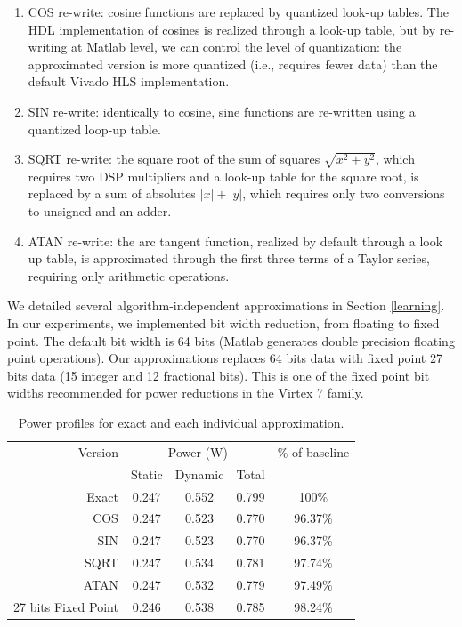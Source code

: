 \begin{enumerate}
\item COS re-write: cosine functions are replaced by quantized look-up tables. The HDL implementation of cosines is realized through a look-up table, but by re-writing at Matlab level, we can control the level of quantization: the approximated version is more quantized (i.e., requires fewer data) than the default Vivado HLS implementation.
\item SIN re-write: identically to cosine, sine functions are re-written using a quantized loop-up table.
\item SQRT re-write: the square root of the sum of squares $\sqrt{x^2+y^2}$, which requires two DSP multipliers and a look-up table for the square root, is replaced by a sum of absolutes $\left| x\right|+\left| y\right|$, which requires only two conversions to unsigned and an adder.
\item ATAN re-write: the arc tangent function, realized by default through a look up table, is approximated through the first three terms of a Taylor series, requiring only arithmetic operations.
\end{enumerate}

\par We detailed several algorithm-independent approximations in Section \ref{learning}. In our experiments, we implemented bit width reduction, from floating to fixed point. The default bit width is 64 bits (Matlab generates double precision floating point operations). Our approximations replaces 64 bits data with fixed point 27 bits data (15 integer and 12 fractional bits). This is one of the fixed point bit widths recommended for power reductions in the Virtex 7 family. 

\begin{table}[h]
\begin{tabular}{r c c c c}
\toprule
Version & \multicolumn{3}{c}{Power (W)} & \% of baseline\\
 & Static & Dynamic & Total &\\
\hline
Exact & 0.247 & 0.552 & 0.799 & 100\%\\
COS & 0.247 & 0.523 & 0.770 & 96.37\%\\
SIN & 0.247 & 0.523 & 0.770 & 96.37\%\\
SQRT & 0.247 & 0.534 & 0.781 & 97.74\%\\
ATAN & 0.247 & 0.532 & 0.779 & 97.49\%\\
27 bits Fixed Point & 0.246 & 0.538 & 0.785 & 98.24\%\\
\hline
\end{tabular}
\caption{Power profiles for exact and each individual approximation.}
\label{table:power_profiles}
\end{table}


